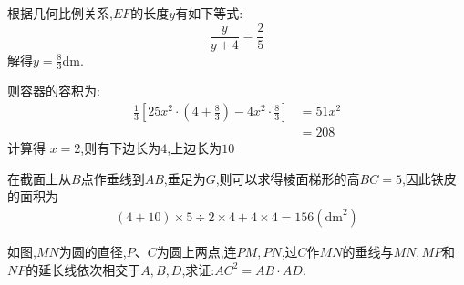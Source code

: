 \documentclass[answers]{exam}
\begin{document}
\begin{questions}
\begin{solution}
\begin{mathenum}
			\item 根据几何比例关系,$EF$的长度$y$有如下等式:
			\begin{equation*}
				\frac{y}{y+4} = \frac25
			\end{equation*}
			解得$y=\frac83$dm.
			\item 则容器的容积为:
			\begin{align*}
				\frac13 \left[ 25x^2 \cdot (4 + \frac83) - 4x^2 \cdot \frac83 \right]
				 & = 51x^2 \\
				 & = 208
			\end{align*}
			计算得 $x = 2$,则有下边长为$4$,上边长为$10$
			\item 在截面上从$B$点作垂线到$AB$,垂足为$G$,则可以求得棱面梯形的高$BC=5$,因此铁皮的面积为
			\begin{align*}
				(4+10)\times 5 \div 2 \times 4  +
				4 \times 4 %
				= 156 (\text{dm}^2)
			\end{align*}
		\end{mathenum}
	\end{solution}
	\question
	\begin{minipage}[t]{.6\textwidth}
		如图,$MN$为圆的直径,$P$、$C$为圆上两点,连$PM,PN$,过$C$作$MN$的垂线与$MN,MP$和$NP$的延长线依次相交于$A,B,D$,求证:$AC^2=AB\cdot AD.$
		\renewcommand{\solutiontitle}{证明:}


\end{minipage}
\end{questions}
\end{document}
